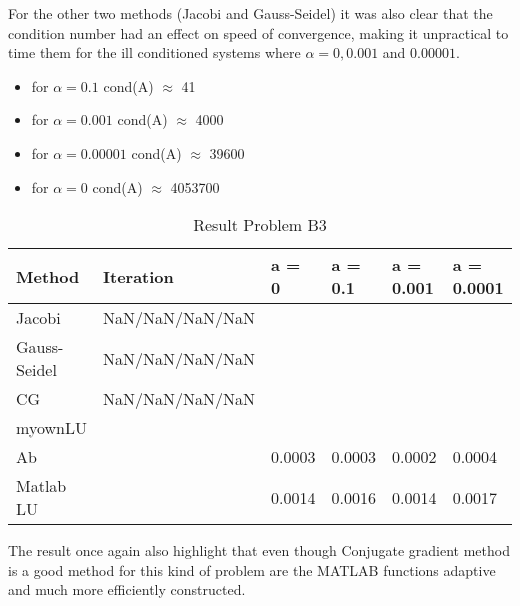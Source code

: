 \documentclass[a4paper]{article}
\begin{document}
For the other two methods (Jacobi and Gauss-Seidel) it was also clear that the condition number had an effect on speed of convergence, making it unpractical to time them for the ill conditioned systems where $\alpha = 0, 0.001$ and $0.00001$. 




\begin{itemize}
    \item for $\alpha = 0.1$  cond(A) $\approx $ 41
    \item for $\alpha = 0.001$  cond(A) $\approx $ 4000
    \item for $\alpha = 0.00001$  cond(A) $\approx $ 39600
    \item for $\alpha = 0$  cond(A) $\approx $ 4053700
\end{itemize}

\begin{table}[ht!]
\centering
\begin{tabular}{llllll}
\textbf{Method}& \textbf{Iteration}& a = 0 & a = 0.1 & a = 0.001 & a = 0.0001 \\ \hline
Jacobi& NaN/NaN/NaN/NaN  & & & &  \\
Gauss-Seidel& NaN/NaN/NaN/NaN  & & & &  \\ 
CG&  NaN/NaN/NaN/NaN & & & & \\
myownLU& & & & &\\
Ab& & 0.0003& 0.0003& 0.0002& 0.0004\\
Matlab LU& & 0.0014& 0.0016& 0.0014& 0.0017\\\hline
\end{tabular}
\caption{Result Problem B3}
\label{tab:tab1}
\end{table}


The result once again also highlight that even though Conjugate gradient method is a good method for this kind of problem are the MATLAB functions adaptive and much more efficiently constructed.





\end{document}
